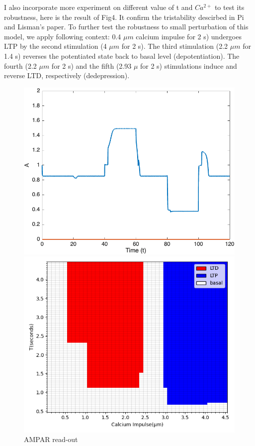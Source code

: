\documentclass{article}
\begin{document}
I also incorporate more experiment on different value of t and $Ca^{2+}$ to test its robustness, here is the result of Fig4. It confirm the tristability descirbed in Pi and Lisman's paper.
\newpage
To further test the robustness to small perturbation of this model, we apply following context: 0.4 $\mu m$ calcium impulse for 2 s) undergoes LTP by the second stimulation (4 $\mu m$ for 2 s). The third stimulation (2.2 $\mu m$ for 1.4 s) reverses the potentiated state back to basal level (depotentiation). The fourth (2.2 $\mu m$ for 2 s) and the fifth (2.93 $\mu$ for 2 s) stimulations induce and reverse LTD, respectively (dedepression).
\begin{figure}[h]
    \centering
    \begin{minipage}[b]{0.45\textwidth}
        \includegraphics[width=\textwidth]{e.png}
        \caption{AMPAR read-out}
        \label{fig:image1}
    \end{minipage}
    \hfill %
    \begin{minipage}[b]{0.45\textwidth}
        \includegraphics[width=\textwidth]{2.png}

\end{minipage}
\end{figure}
\end{document}
